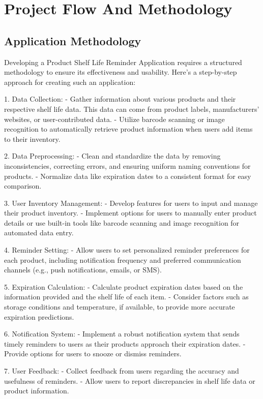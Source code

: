\chapter{Project Flow And Methodology}
\section{Application Methodology}



Developing a Product Shelf Life Reminder Application requires a structured methodology to ensure its effectiveness and usability. Here's a step-by-step approach for creating such an application:

1. Data Collection:
   - Gather information about various products and their respective shelf life data. This data can come from product labels, manufacturers' websites, or user-contributed data.
   - Utilize barcode scanning or image recognition to automatically retrieve product information when users add items to their inventory.

2. Data Preprocessing:
   - Clean and standardize the data by removing inconsistencies, correcting errors, and ensuring uniform naming conventions for products.
   - Normalize data like expiration dates to a consistent format for easy comparison.

3. User Inventory Management:
   - Develop features for users to input and manage their product inventory.
   - Implement options for users to manually enter product details or use built-in tools like barcode scanning and image recognition for automated data entry.

4. Reminder Setting:
   - Allow users to set personalized reminder preferences for each product, including notification frequency and preferred communication channels (e.g., push notifications, emails, or SMS).

5. Expiration Calculation:
   - Calculate product expiration dates based on the information provided and the shelf life of each item.
   - Consider factors such as storage conditions and temperature, if available, to provide more accurate expiration predictions.

6. Notification System:
   - Implement a robust notification system that sends timely reminders to users as their products approach their expiration dates.
   - Provide options for users to snooze or dismiss reminders.

7. User Feedback:
   - Collect feedback from users regarding the accuracy and usefulness of reminders.
   - Allow users to report discrepancies in shelf life data or product information.

